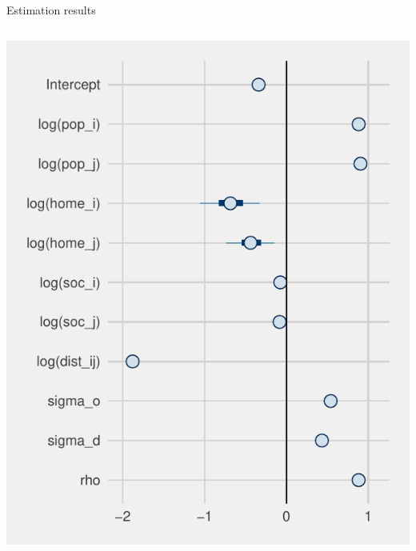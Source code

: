 \documentclass{beamer}
\begin{document}
\begin{frame}{Estimation results}
\begin{columns}
\begin{column}{0.5\textwidth}
			\begin{center}
				\includegraphics[width=\textwidth]{../fig/forestplot}      
			\end{center}
		\end{column}
	\end{columns}
\end{frame}
\end{document}
